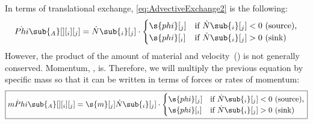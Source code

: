 In terms of translational exchange, \autoref{eq:AdvectiveExchange2} is the following:
\begin{equation}
  \label{eq:TranslationalAdvectiveExchange1}
  \dot{Phi}\sub{_A}[ ][_i][_j] = \dot{N}\sub{_i}[_j]\cdot
  \begin{cases}%
    \s{phi}[_j] & \text{if $\dot{N}\sub{_i}[_j] < 0$ (source),} \\
    \s{phi}[_i] & \text{if $\dot{N}\sub{_i}[_j] > 0$ (sink)}
  \end{cases}
\end{equation}
However, the product of the amount of material and velocity~() is not generally conserved.  Momentum, , is.  Therefore, we will multiply the previous equation by specific mass so that it can be written in terms of forces or rates of momentum:
\begin{equation}
  \label{eq:TranslationalAdvectiveExchange}
  \boxed{\dot{mPhi}\sub{_A}[ ][_i][_j] = \s{m}[_j]\dot{N}\sub{_i}[_j]\cdot
  \begin{cases}%
    \s{phi}[_j] & \text{if $\dot{N}\sub{_i}[_j] < 0$ (source),} \\
    \s{phi}[_i] & \text{if $\dot{N}\sub{_i}[_j] > 0$ (sink)}
  \end{cases}}
\end{equation}

